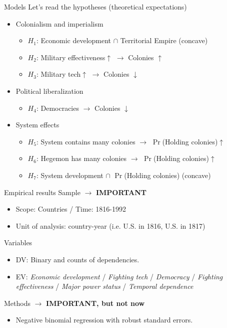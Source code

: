 \documentclass[xcolor=dvipsnames]{beamer}
\begin{document}
	\begin{frame}[fragile]{Models}
		Let's read the hypotheses (theoretical expectations)
		\begin{itemize}
			\item Colonialism and imperialism
			\begin{itemize}
				\item \textbf{\textit{$H_1$}}: Economic development $\cap$ Territorial Empire (concave)
				\item \textbf{\textit{$H_2$}}: Military effectiveness$\uparrow$ $\rightarrow$ Colonies $\uparrow$
				\item \textbf{\textit{$H_3$}}: Military tech$\uparrow$ $\rightarrow$ Colonies $\downarrow$
			\end{itemize}
			\item Political liberalization
			\begin{itemize}
				\item \textbf{\textit{$H_4$}}: Democracies $\rightarrow$ Colonies $\downarrow$
			\end{itemize}
			\item System effects
			\begin{itemize}
				\item \textbf{\textit{$H_5$}}: System contains many colonies $\rightarrow$ $\Pr$(Holding colonies)$\uparrow$
				\item \textbf{\textit{$H_6$}}: Hegemon has many colonies $\rightarrow$ $\Pr$(Holding colonies)$\uparrow$
				\item \textbf{\textit{$H_7$}}: System development $\cap$ $\Pr$(Holding colonies) (concave)
			\end{itemize}
		\end{itemize} 
	\end{frame}
	
	\begin{frame}[fragile]{Empirical results}
		Sample \pause $\rightarrow$ \textbf{IMPORTANT}
		\begin{itemize}
			\item Scope: Countries / Time: 1816-1992
			\item Unit of analysis: country-year (i.e. U.S. in 1816, U.S. in 1817)
		\end{itemize}
		Variables
		\begin{itemize}
			\item DV: Binary and counts of dependencies.
			\item EV: \textit{Economic development} / \textit{Fighting tech} / \textit{Democracy} / \textit{Fighting effectiveness} / \textit{Major power status} / \textit{Temporal dependence}
		\end{itemize}
		Methods \pause $\rightarrow$ \textbf{IMPORTANT, but not now}
		\begin{itemize}
			\item Negative binomial regression with robust standard errors.
		\end{itemize}
	\end{frame}
	
\end{document}
